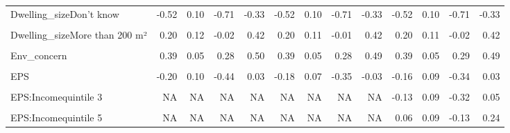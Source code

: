 \begin{table}
\begin{tabular}[t]{lrrrrrrrrrrrr}
Dwelling\_sizeDon't know & -0.52 & 0.10 & -0.71 & -0.33 & -0.52 & 0.10 & -0.71 & -0.33 & -0.52 & 0.10 & -0.71 & -0.33\\
\cellcolor{gray!10}{Dwelling\_sizeLess than 25 m²} & \cellcolor{gray!10}{-1.05} & \cellcolor{gray!10}{0.24} & \cellcolor{gray!10}{-1.55} & \cellcolor{gray!10}{-0.57} & \cellcolor{gray!10}{-1.05} & \cellcolor{gray!10}{0.25} & \cellcolor{gray!10}{-1.57} & \cellcolor{gray!10}{-0.55} & \cellcolor{gray!10}{-1.04} & \cellcolor{gray!10}{0.25} & \cellcolor{gray!10}{-1.54} & \cellcolor{gray!10}{-0.56}\\
Dwelling\_sizeMore than 200 m² & 0.20 & 0.12 & -0.02 & 0.42 & 0.20 & 0.11 & -0.01 & 0.42 & 0.20 & 0.11 & -0.02 & 0.42\\
\cellcolor{gray!10}{Rural} & \cellcolor{gray!10}{0.06} & \cellcolor{gray!10}{0.06} & \cellcolor{gray!10}{-0.06} & \cellcolor{gray!10}{0.17} & \cellcolor{gray!10}{0.06} & \cellcolor{gray!10}{0.06} & \cellcolor{gray!10}{-0.06} & \cellcolor{gray!10}{0.17} & \cellcolor{gray!10}{0.06} & \cellcolor{gray!10}{0.06} & \cellcolor{gray!10}{-0.05} & \cellcolor{gray!10}{0.17}\\
Env\_concern & 0.39 & 0.05 & 0.28 & 0.50 & 0.39 & 0.05 & 0.28 & 0.49 & 0.39 & 0.05 & 0.29 & 0.49\\
\cellcolor{gray!10}{Gov\_support} & \cellcolor{gray!10}{9.77} & \cellcolor{gray!10}{2.50} & \cellcolor{gray!10}{6.52} & \cellcolor{gray!10}{17.30} & \cellcolor{gray!10}{9.66} & \cellcolor{gray!10}{2.40} & \cellcolor{gray!10}{6.56} & \cellcolor{gray!10}{16.98} & \cellcolor{gray!10}{9.74} & \cellcolor{gray!10}{2.49} & \cellcolor{gray!10}{6.48} & \cellcolor{gray!10}{16.97}\\
EPS & -0.20 & 0.10 & -0.44 & 0.03 & -0.18 & 0.07 & -0.35 & -0.03 & -0.16 & 0.09 & -0.34 & 0.03\\
\cellcolor{gray!10}{EPS:Incomequintile 2} & \cellcolor{gray!10}{NA} & \cellcolor{gray!10}{NA} & \cellcolor{gray!10}{NA} & \cellcolor{gray!10}{NA} & \cellcolor{gray!10}{NA} & \cellcolor{gray!10}{NA} & \cellcolor{gray!10}{NA} & \cellcolor{gray!10}{NA} & \cellcolor{gray!10}{0.03} & \cellcolor{gray!10}{0.09} & \cellcolor{gray!10}{-0.15} & \cellcolor{gray!10}{0.21}\\
EPS:Incomequintile 3 & NA & NA & NA & NA & NA & NA & NA & NA & -0.13 & 0.09 & -0.32 & 0.05\\
\cellcolor{gray!10}{EPS:Incomequintile 4} & \cellcolor{gray!10}{NA} & \cellcolor{gray!10}{NA} & \cellcolor{gray!10}{NA} & \cellcolor{gray!10}{NA} & \cellcolor{gray!10}{NA} & \cellcolor{gray!10}{NA} & \cellcolor{gray!10}{NA} & \cellcolor{gray!10}{NA} & \cellcolor{gray!10}{-0.11} & \cellcolor{gray!10}{0.09} & \cellcolor{gray!10}{-0.30} & \cellcolor{gray!10}{0.08}\\
EPS:Incomequintile 5 & NA & NA & NA & NA & NA & NA & NA & NA & 0.06 & 0.09 & -0.13 & 0.24\\
\bottomrule
\end{tabular}
\end{table}

